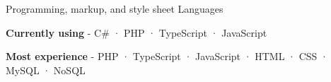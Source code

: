 

\begin{cventries}

  \cventry
    {Programming, markup, and style sheet} %
    {Languages} %
    {} %
    {} %
    {
      \begin{cvitems} %
        \item {\textbf{Currently using} \hspace{0.03cm} - \hspace{0.03cm}  C\# \hspace{0.03cm} · \hspace{0.03cm} PHP \hspace{0.03cm} · \hspace{0.03cm} TypeScript \hspace{0.03cm} · \hspace{0.03cm} JavaScript} %
        \item {\textbf{Most experience} \hspace{0.03cm} - \hspace{0.03cm} PHP \hspace{0.03cm} · \hspace{0.03cm} TypeScript \hspace{0.03cm} · \hspace{0.03cm} JavaScript \hspace{0.03cm} · \hspace{0.03cm} HTML \hspace{0.03cm} · \hspace{0.03cm} CSS \hspace{0.03cm} · \hspace{0.03cm} MySQL \hspace{0.03cm} · \hspace{0.03cm} NoSQL} %

\end{cvitems}}
\end{cventries}
